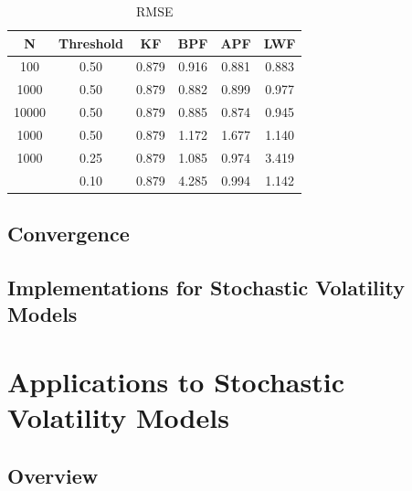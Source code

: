 \documentclass[
]{book}
\theoremstyle{break}
\theoremstyle{nonumberplain}
\begin{document}
\begin{longtable}[t]{cccccc}
\caption{\label{tab:unnamed-chunk-31}RMSE}\\
\toprule
N & Threshold & KF & BPF & APF & LWF\\
\midrule
100 & 0.50 & 0.879 & 0.916 & 0.881 & 0.883\\
1000 & 0.50 & 0.879 & 0.882 & 0.899 & 0.977\\
10000 & 0.50 & 0.879 & 0.885 & 0.874 & 0.945\\
1000 & 0.50 & 0.879 & 1.172 & 1.677 & 1.140\\
1000 & 0.25 & 0.879 & 1.085 & 0.974 & 3.419\\
\addlinespace
1000 & 0.10 & 0.879 & 4.285 & 0.994 & 1.142\\
\bottomrule
\end{longtable}

\section{Convergence}\label{pf_converg}

\section{Implementations for Stochastic Volatility Models}

\chapter{Applications to Stochastic Volatility Models}

\section{Overview}
\end{document}
